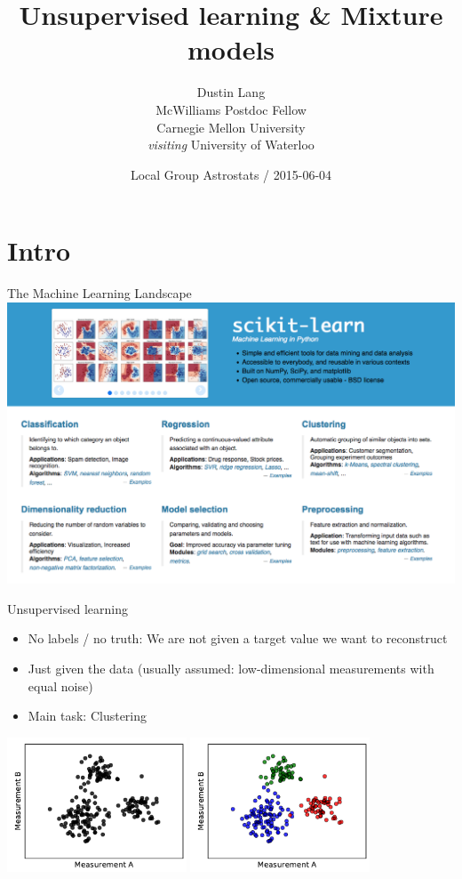 \documentclass[compress,t]{beamer}
\title{Unsupervised learning \& Mixture models}
\author{Dustin Lang \\ {\small McWilliams Postdoc Fellow \\ Carnegie Mellon University \\ \emph{visiting} University of Waterloo}}
\date{Local Group Astrostats \hspace*{0.5em}/\hspace*{0.5em} 2015-06-04}
\begin{document}
\begin{frame}
  \titlepage
\end{frame}

\section{Intro}

\begin{frame}{The Machine Learning Landscape}%
\includegraphics[width=\textwidth]{landscape}
\end{frame}

\begin{frame}{Unsupervised learning}
  \begin{itemize}
    \item \alert{No labels} / \alert{no truth}: We are not given a target value we want to reconstruct
    \item Just given the data (usually assumed: low-dimensional measurements
      with equal noise)
    \item Main task: \alert{Clustering}
  \end{itemize}

  \includegraphics[width=0.4\textwidth]{ex3a}
  \hspace{1em}
  \raisebox{0.18\textheight}{$\longrightarrow$}
  \hspace{1em}
  \includegraphics[width=0.4\textwidth]{ex3b}

\end{frame}
\end{document}
